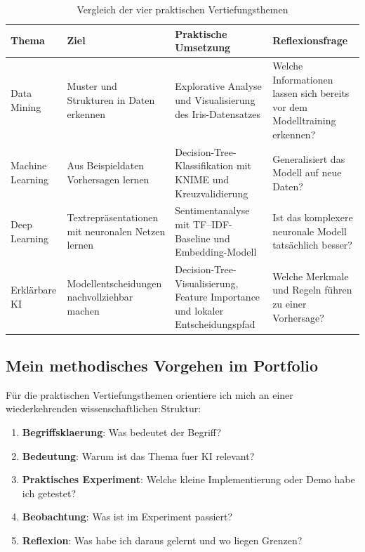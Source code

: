 \documentclass[12pt,a4paper]{article}
\begin{document}
\begin{table}[H]
\centering
\begin{tabular}{p{2.7cm}p{3.7cm}p{4.3cm}p{3.3cm}}
\toprule
\textbf{Thema} &
\textbf{Ziel} &
\textbf{Praktische Umsetzung} &
\textbf{Reflexionsfrage} \\
\midrule

Data Mining &
Muster und Strukturen in Daten erkennen &
Explorative Analyse und Visualisierung des Iris-Datensatzes &
Welche Informationen lassen sich bereits vor dem Modelltraining
erkennen? \\

Machine Learning &
Aus Beispieldaten Vorhersagen lernen &
Decision-Tree-Klassifikation mit KNIME und Kreuzvalidierung &
Generalisiert das Modell auf neue Daten? \\

Deep Learning &
Textrepräsentationen mit neuronalen Netzen lernen &
Sentimentanalyse mit TF--IDF-Baseline und Embedding-Modell &
Ist das komplexere neuronale Modell tatsächlich besser? \\

Erklärbare KI &
Modellentscheidungen nachvollziehbar machen &
Decision-Tree-Visualisierung, Feature Importance und lokaler
Entscheidungspfad &
Welche Merkmale und Regeln führen zu einer Vorhersage? \\

\bottomrule
\end{tabular}
\caption{Vergleich der vier praktischen Vertiefungsthemen}
\label{tab:themenvergleich}
\end{table}
\subsection{Mein methodisches Vorgehen im Portfolio}

Für die praktischen Vertiefungsthemen orientiere ich mich an einer
wiederkehrenden wissenschaftlichen Struktur:

\begin{enumerate}
    \item \textbf{Begriffsklaerung}: Was bedeutet der Begriff?
    \item \textbf{Bedeutung}: Warum ist das Thema fuer KI relevant?
    \item \textbf{Praktisches Experiment}: Welche kleine Implementierung oder Demo habe ich getestet?
    \item \textbf{Beobachtung}: Was ist im Experiment passiert?
    \item \textbf{Reflexion}: Was habe ich daraus gelernt und wo liegen Grenzen?
\end{enumerate}
\end{document}
